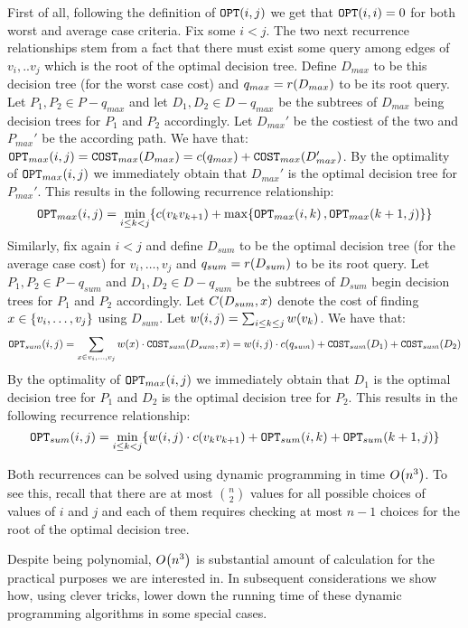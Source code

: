 First of all, following the definition of $\texttt{OPT}\mathopen{}\left( i,j \right)$ we get that $\texttt{OPT}\mathopen{}\left( i,i \right)=0$ for both worst and average case criteria.
Fix some $i<j$. The two next recurrence relationships stem from a fact that  there must exist some query among edges of $v_i,..v_j$ which is the root of the optimal decision tree. Define $D_{max}$ to be this decision tree (for the worst case cost) and $q_{max}=r\mathopen{}\left( D_{max} \right)$ to be its root query. Let $P_1,P_2\in P-q_{max}$ and let $D_1, D_2\in D-q_{max}$ be the subtrees of $D_{max}$ being decision trees for $P_1$ and $P_2$ accordingly. Let $D_{max}'$ be the costiest of the two and $P_{max}'$ be the according path. We have that: $\texttt{OPT}_{max}\mathopen{}\left( i,j \right)=\texttt{COST}_{max}\mathopen{}\left( D_{max} \right)=c\mathopen{}\left( q_{max} \right)+\texttt{COST}_{max}\mathopen{}\left( D_{max}' \right)$. 
By the optimality of $\texttt{OPT}_{max}\mathopen{}\left( i,j \right)$ we immediately obtain that $D_{max}'$ is the optimal decision tree for $P_{max}'$. This results in the following recurrence relationship:
$$
\texttt{OPT}_{max}\mathopen{}\left( i,j \right) = \min_{i\leq k<j}\mathopen{}\left\{ c\mathopen{}\left( v_kv_{k+1} \right)+\max\mathopen{}\left\{ \texttt{OPT}_{max}\mathopen{}\left( i, k \right), \texttt{OPT}_{max}\mathopen{}\left( k+1, j \right) \right\} \right\}
$$
Similarly, fix again $i<j$ and define $D_{sum}$ to be the optimal decision tree (for the average case cost) for $v_i,\dots,v_j$ and $q_{sum}=r\mathopen{}\left( D_{sum} \right)$ to be its root query. Let $P_1,P_2\in P-q_{sum}$ and $D_1, D_2\in D-q_{sum}$ be the subtrees of $D_{sum}$ begin decision trees for $P_1$ and $P_2$ accordingly. Let $C\mathopen{}\left( D_{sum}, x \right)$ denote the cost of finding $x\in\mathopen{}\left\{ v_i,\dots,v_j \right\}$ using $D_{sum}$. Let $w\mathopen{}\left( i,j \right)=\sum_{i\leq k\leq j}w\mathopen{}\left( v_k \right)$. We have that:
$$
\texttt{OPT}_{sum}\mathopen{}\left( i,j \right)=\sum_{x\in v_i,\dots,v_j}w\mathopen{}\left( x \right)\cdot \texttt{COST}_{sum}\mathopen{}\left( D_{sum}, x \right)=w\mathopen{}\left( i,j \right)\cdot c\mathopen{}\left( q_{sum} \right) + \texttt{COST}_{sum}\mathopen{}\left( D_1 \right) + \texttt{COST}_{sum}\mathopen{}\left( D_2 \right)
$$
By the optimality of $\texttt{OPT}_{max}\mathopen{}\left( i,j \right)$ we immediately obtain that $D_1$ is the optimal decision tree for $P_1$ and $D_2$ is the optimal decision tree for $P_2$. This results in the following recurrence relationship:
$$
\texttt{OPT}_{sum}\mathopen{}\left( i,j \right) = \min_{i\leq k<j}\mathopen{}\left\{ w\mathopen{}\left( i,j \right)\cdot c\mathopen{}\left( v_kv_{k+1} \right)+\texttt{OPT}_{sum}\mathopen{}\left( i, k \right)+ \texttt{OPT}_{sum}\mathopen{}\left( k+1, j \right) \right\}
$$

Both recurrences can be solved using dynamic programming in time $O\mathopen{}\left( n^3 \right)$. To see this, recall that there are at most $\binom{n}{2}$ values for all possible choices of values of $i$ and $j$ and each of them requires checking at most $n-1$ choices for the root of the optimal decision tree.

Despite being polynomial, $O\mathopen{}\left( n^3 \right)$ is substantial amount of calculation for the practical purposes we are interested in. In subsequent considerations we show how, using clever tricks, lower down the running time of these dynamic programming algorithms in some special cases. 
